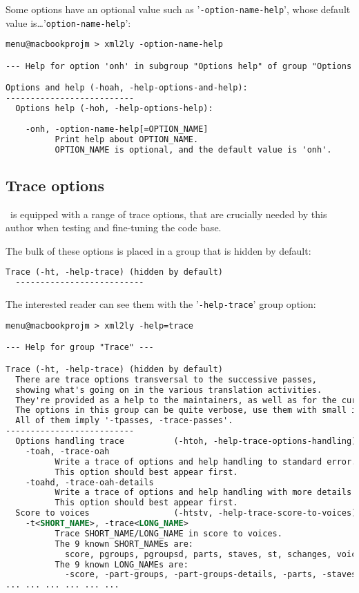 \documentclass[12pt,a4paper]{article}
\begin{document}
Some options have an optional value such as '{\tt -option-name-help}', whose default value is\dots '{\tt option-name-help}':
\begin{lstlisting}[language=XML]
menu@macbookprojm > xml2ly -option-name-help        

--- Help for option 'onh' in subgroup "Options help" of group "Options and help" ---

Options and help (-hoah, -help-options-and-help):
--------------------------
  Options help (-hoh, -help-options-help):
  
    -onh, -option-name-help[=OPTION_NAME]
          Print help about OPTION_NAME.
          OPTION_NAME is optional, and the default value is 'onh'.
\end{lstlisting}

\subsection{Trace options}

\xmlToLy\ is equipped with a range of trace options, that are crucially needed by this author when testing and fine-tuning the code base.

The bulk of these options is placed in a group that is hidden by default:
\begin{lstlisting}[language=XML]
  Trace (-ht, -help-trace) (hidden by default)
  --------------------------
\end{lstlisting}

The interested reader can see them with the '{\tt -help-trace}' group option:
\begin{lstlisting}[language=XML]
menu@macbookprojm > xml2ly -help=trace

--- Help for group "Trace" ---

Trace (-ht, -help-trace) (hidden by default)
  There are trace options transversal to the successive passes,
  showing what's going on in the various translation activities.
  They're provided as a help to the maintainers, as well as for the curious.
  The options in this group can be quite verbose, use them with small input data!
  All of them imply '-tpasses, -trace-passes'.
--------------------------
  Options handling trace          (-htoh, -help-trace-options-handling):
    -toah, -trace-oah
          Write a trace of options and help handling to standard error.
          This option should best appear first.
    -toahd, -trace-oah-details
          Write a trace of options and help handling with more details to standard error.
          This option should best appear first.
  Score to voices                 (-htstv, -help-trace-score-to-voices):
    -t<SHORT_NAME>, -trace<LONG_NAME>
          Trace SHORT_NAME/LONG_NAME in score to voices.
          The 9 known SHORT_NAMEs are:
            score, pgroups, pgroupsd, parts, staves, st, schanges, voices and voicesd.
          The 9 known LONG_NAMEs are:
            -score, -part-groups, -part-groups-details, -parts, -staves.
... ... ... ... ... ...
\end{lstlisting}
\end{document}
